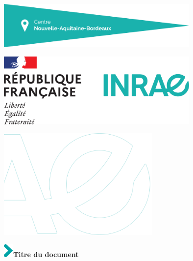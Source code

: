 \begin{titlepage}

\vspace*{-4.5cm}

%

\vspace*{12.15cm}

\hspace{-2.7cm}
\includegraphics[width=10cm]{templates/cartouche}\par

\hspace{12cm}
\includegraphics[width=10cm]{templates/bloc-etat}\par

\vspace*{-2cm}

\hspace{-2.8cm}
\includegraphics[width=8cm]{templates/sigle-inrae}

\vspace*{1cm}

\hspace{-1cm}
\setlength{\parindent}{0cm}
\includegraphics[width=0.5cm]{templates/fleche-titre}\hspace{0.3cm}\textcolor{inrae}{\sffamily\Huge\bfseries Titre du document}\par\bigskip


\end{titlepage}
